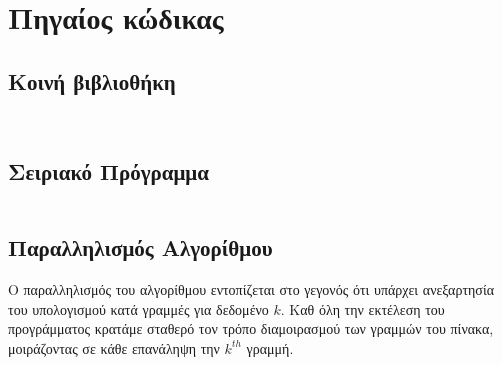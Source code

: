 



\renewcommand{\theenumi}{\roman{enumi}}


\def\thesubsection {Ζητούμενο \arabic{subsection}}
\section*{Πηγαίος κώδικας}


\subsection*{Κοινή βιβλιοθήκη}

\inputminted[linenos,fontsize=\scriptsize,frame=leftline]{c}{files/src-lib-common.h}

\inputminted[linenos,fontsize=\scriptsize,frame=leftline]{c}{files/src-lib-common.c}


\setcounter{section}{1}

\subsection{Σειριακό Πρόγραμμα}

\inputminted[linenos,fontsize=\scriptsize,frame=leftline]{c}{files/src-serial-main.c}



\subsection{Παραλληλισμός Αλγορίθμου}

Ο παραλληλισμός του αλγορίθμου εντοπίζεται στο γεγονός ότι υπάρχει ανεξαρτησία
του υπολογισμού κατά γραμμές για δεδομένο $k$. Καθ όλη την εκτέλεση του
προγράμματος κρατάμε σταθερό τον τρόπο διαμοιρασμού των γραμμών του πίνακα,
μοιράζοντας σε κάθε επανάληψη την $k^{th}$ γραμμή. 

